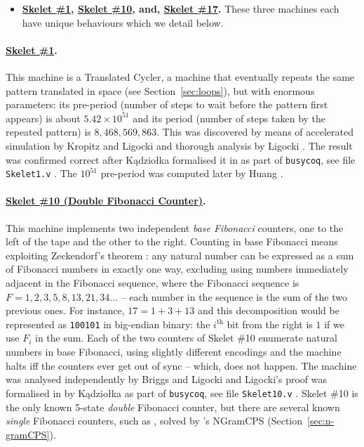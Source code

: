 \begin{itemize}
    \item \textbf{\href{https://bbchallenge.org/1RB1RD_1LC0RC_1RA1LD_0RE0LB_---1RC}{Skelet \#1}, \href{https://bbchallenge.org/1RB0RA_0LC1RA_1RE1LD_1LC0LD_---0RB}{Skelet \#10}, and, \href{https://bbchallenge.org/1RB---_0LC1RE_0LD1LC_1RA1LB_0RB0RA}{Skelet \#17}.} These three machines each have unique behaviours which we detail below.
\end{itemize}
\vspace{-1.5em}
\paragraph{\href{https://bbchallenge.org/1RB1RD_1LC0RC_1RA1LD_0RE0LB_---1RC}{Skelet \#1}.} This machine is a Translated Cycler, \ie a machine that eventually repeats the same pattern translated in space (see Section~\ref{sec:loops}), but with enormous parameters: its pre-period (number of steps to wait before the pattern first appears) is about $5.42 \times 10^{51}$ and its period (number of steps taken by the repeated pattern) is $8,468,569,863$. This was discovered by means of accelerated simulation by Kropitz and Ligocki \cite{uniSk1} and thorough analysis by Ligocki \cite{ShawnSkelet1Before, ShawnSkelet1}. The result was confirmed correct after Kądziołka formalised it in \Coq as part of \texttt{busycoq}, see file \texttt{Skelet1.v} \cite{busycoq}. The $10^{51}$ pre-period was computed later by Huang \cite{hipparcosSk1}.
\vspace{-0.5em}
\paragraph{\href{https://bbchallenge.org/1RB0RA_0LC1RA_1RE1LD_1LC0LD_---0RB}{Skelet \#10 (Double Fibonacci Counter)}.} This machine implements two independent \textit{base Fibonacci} counters, one to the left of the tape and the other to the right. Counting in base Fibonacci means exploiting Zeckendorf's theorem \cite{wiki:Zeckendorf's_theorem}: any natural number can be expressed as a sum of Fibonacci numbers in exactly one way, excluding using numbers immediately adjacent in the Fibonacci sequence, where the Fibonacci sequence is $F = 1,2,3,5,8,13,21,34\dots$ -- each number in the sequence is the sum of the two previous ones. For instance, $17 = 1 + 3 + 13$ and this decomposition would be represented as \texttt{100101} in big-endian binary: the $i^\text{th}$ bit from the right is $1$ if we use $F_i$ in the sum. Each of the two counters of Skelet \#10 enumerate natural numbers in base Fibonacci, using slightly different encodings and the machine halts iff the counters ever get out of sync -- which, does not happen. The machine was analysed independently by Briggs and Ligocki \cite{DanBriggs,ShawnSkelet10} and Ligocki's proof \cite{ShawnSkelet10} was formalised in \Coq by Kądziołka as part of \texttt{busycoq}, see file \texttt{Skelet10.v} \cite{busycoq}. Skelet \#10 is the only known 5-state \textit{double} Fibonacci counter, but there are several known \textit{single} Fibonacci counters, such as , solved by \CoqBB's NGramCPS (Section~\ref{sec:n-gramCPS}).

